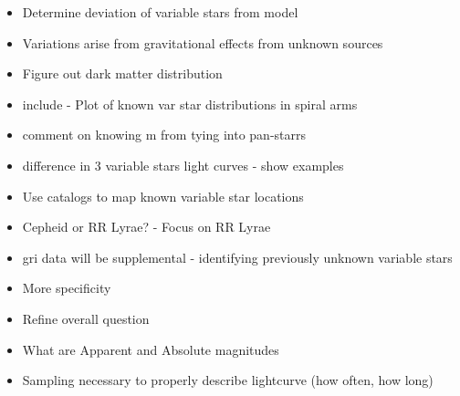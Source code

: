 \documentclass[letterpaper,11pt]{article}
\begin{document}
\begin{itemize}
	\item{} Determine deviation of variable stars from model
	\item{} Variations arise from gravitational effects from unknown sources
	\item{} Figure out dark matter distribution
	\item{} include - Plot of known var star distributions in spiral arms
	\item{} comment on knowing m from tying into pan-starrs
	\item{} difference in 3 variable stars light curves - show examples
\end{itemize}

\begin{itemize}
	\item{} Use catalogs to map known variable star locations
	\item{} Cepheid or RR Lyrae? - Focus on RR Lyrae
	\item{} gri data will be supplemental - identifying previously unknown variable stars
	\item{} More specificity
	\item{} Refine overall question
	\item{} What are Apparent and Absolute magnitudes
	\item{} Sampling necessary to properly describe lightcurve (how often, how long)
\end{itemize}
\fi
\end{document}
